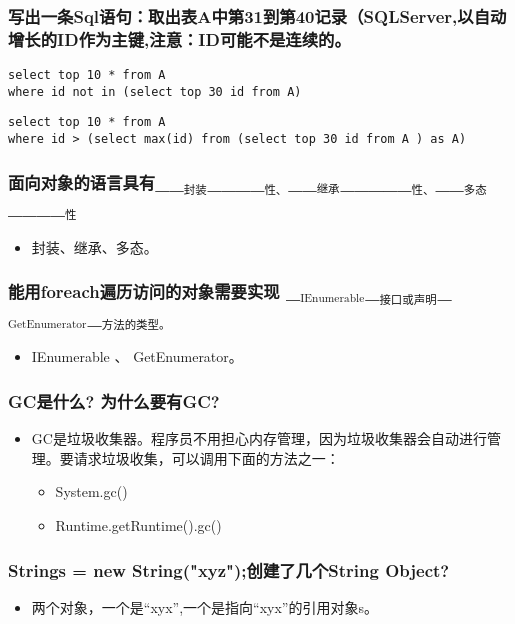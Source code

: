 \documentclass[9pt, b5paper]{article}
\begin{document}
\subsubsection{写出一条Sql语句：取出表A中第31到第40记录（SQLServer,以自动增长的ID作为主键,注意：ID可能不是连续的。}
\label{sec-1-1-31}
\begin{verbatim}
select top 10 * from A 
where id not in (select top 30 id from A)
\end{verbatim}
\begin{verbatim}
select top 10 * from A 
where id > (select max(id) from (select top 30 id from A ) as A)
\end{verbatim}
\subsubsection{面向对象的语言具有\_\_$_{\text{封装}}$\_\_\_\_$_{\text{性、}}$\_\_$_{\text{继承}}$\_\_\_\_\_$_{\text{性、}}$\_\_$_{\text{多态}}$\_\_\_\_$_{\text{性}}$}
\label{sec-1-1-32}
\begin{itemize}
\item 封装、继承、多态。
\end{itemize}
\subsubsection{能用foreach遍历访问的对象需要实现 \_$_{\text{IEnumerable}}$\_$_{\text{接口或声明}}$\_$_{\text{GetEnumerator}}$\_$_{\text{方法的类型。}}$}
\label{sec-1-1-33}
\begin{itemize}
\item IEnumerable 、 GetEnumerator。
\end{itemize}
\subsubsection{GC是什么? 为什么要有GC?}
\label{sec-1-1-34}
\begin{itemize}
\item GC是垃圾收集器。程序员不用担心内存管理，因为垃圾收集器会自动进行管理。要请求垃圾收集，可以调用下面的方法之一：
\begin{itemize}
\item System.gc()
\item Runtime.getRuntime().gc()
\end{itemize}
\end{itemize}
\subsubsection{Strings = new String("xyz");创建了几个String Object?}
\label{sec-1-1-35}
\begin{itemize}
\item 两个对象，一个是“xyx”,一个是指向“xyx”的引用对象s。
\end{itemize}
\end{document}
